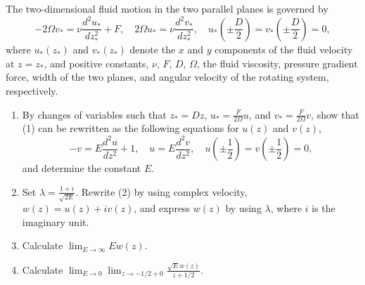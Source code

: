 \documentclass{article}
\begin{document}
\begin{enumerate}[label=\fbox{\arabic*}]
        \begin{center}
        \end{center}

        The two-dimensional fluid motion in the two parallel planes is governed by
        \begin{equation}
          -2\Omega v_* = \nu \frac{d^2 u_*}{dz_*^2} + F, \quad 2\Omega u_* = \nu \frac{d^2 v_*}{dz_*^2}, \quad u_*\left(\pm\frac{D}{2}\right) = v_*\left(\pm\frac{D}{2}\right) = 0, \tag{1}
        \end{equation}
        where $u_*(z_*)$ and $v_*(z_*)$ denote the $x$ and $y$ components of the fluid velocity at $z = z_*$, and positive constants, $\nu$, $F$, $D$, $\Omega$, the fluid viscosity, pressure gradient force, width of the two planes, and angular velocity of the rotating system, respectively.
        \begin{enumerate}[label=\arabic*.]
          \item By changes of variables such that $z_* = Dz$, $u_* = \frac{F}{2\Omega}u$, and $v_* = \frac{F}{2\Omega}v$, show that (1) can be rewritten as the following equations for $u(z)$ and $v(z)$,
                \begin{equation}
                  -v = E \frac{d^2 u}{dz^2} + 1, \quad u = E \frac{d^2 v}{dz^2}, \quad u\left(\pm\frac{1}{2}\right) = v\left(\pm\frac{1}{2}\right) = 0, \tag{2}
                \end{equation}
                and determine the constant $E$.
          \item Set $\lambda = \frac{1+i}{\sqrt{2E}}$. Rewrite (2) by using complex velocity, $w(z) = u(z) + iv(z)$, and express $w(z)$ by using $\lambda$, where $i$ is the imaginary unit.
          \item Calculate $\lim_{E \to \infty} E w(z)$.
          \item Calculate $\lim_{E \to 0} \lim_{z \to -1/2 + 0} \frac{\sqrt{E} w(z)}{z + 1/2}$.
        \end{enumerate}


\end{enumerate}
\end{document}
